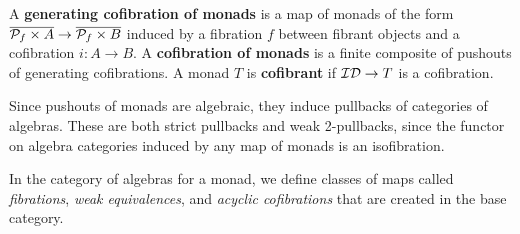 \documentclass{amsart}
\begin{document}
\begin{defn}
  A \textbf{generating cofibration of monads} is a map of monads of the form $\overline{ \mathcal{P}_{f} \times A} \to \overline{\mathcal{P}_{f} \times B}$ induced by a fibration $f$ between fibrant objects and a cofibration $i:A\to B$.
  A \textbf{cofibration of monads} is a finite composite of pushouts of generating cofibrations.
  A monad $T$ is \textbf{cofibrant} if $\mathcal{ID} \to T$ is a cofibration.
\end{defn}

Since pushouts of monads are algebraic, they induce pullbacks of categories of algebras.
These are both strict pullbacks and weak 2-pullbacks, since the functor on algebra categories induced by any map of monads is an isofibration.

In the category of algebras for a monad, we define classes of maps called \emph{fibrations}, \emph{weak equivalences}, and \emph{acyclic cofibrations} that are created in the base category.
\end{document}
